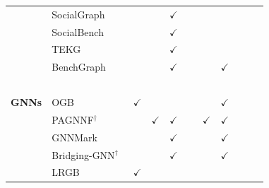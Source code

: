 \begin{landscape}
\begin{table}[htbp]
\begin{tabular}{ll|cccccccc}
               {\footnotesize ~              }  & {\footnotesize SocialGraph~\cite{Angles2013}           }      &               &              & $\checkmark$  &               &               &               &               &               \\
               {\footnotesize ~              }  & {\footnotesize SocialBench~\cite{Erling2015}           }      &               &              & $\checkmark$  &               &               &               &               &               \\
               {\footnotesize ~              }  & {\footnotesize TEKG~\cite{Mcnight2021}           }            &               &              & $\checkmark$  &               &               &               &               &               \\
               {\footnotesize ~              }  & {\footnotesize BenchGraph~\cite{Javor2022,Javor2023}   }      &               &              & $\checkmark$  &               &               & $\checkmark$  &               &               \\
               {\footnotesize ~              }  & {\footnotesize ~                                       }      &   ~           &       ~      &       ~       &       ~       &       ~       &       ~       &       ~       &      ~        \\
               {\footnotesize \textbf{GNNs}  }  & {\footnotesize OGB~\cite{Hu2020}                       }      & $\checkmark$  &              &               &               &               & $\checkmark$  &               &               \\
               {\footnotesize ~              }  & {\footnotesize PAGNNF${^\dagger}$~\cite{Wu2021a}          }   &               & $\checkmark$ & $\checkmark$  &               & $\checkmark$  & $\checkmark$  &               &               \\
               {\footnotesize ~              }  & {\footnotesize GNNMark~\cite{Baruah2021}               }      &               &              & $\checkmark$  &               &               & $\checkmark$  &               &               \\
               {\footnotesize ~              }  & {\footnotesize Bridging-GNN$^{\dagger}$~\cite{Huang2021}  }   &               &              & $\checkmark$  &               &               & $\checkmark$  &               &               \\
               {\footnotesize ~              }  & {\footnotesize LRGB~\cite{Dwivedi2022}                 }      & $\checkmark$  &              &               &               &               &               &               &               \\

\end{tabular}
\end{table}
\end{landscape}

